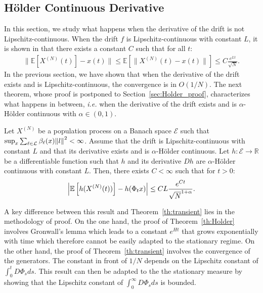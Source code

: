 \documentclass[sigconf]{acmart}
\newcommand\XN{X^{(N)}}
\newcommand\E{\mathcal{E}}
\newcommand\R{\mathbb{R}}
\newcommand\calL{\mathcal{L}}
\newcommand\esp[1]{{\mathchoice{\besp{#1}}{\sesp{#1}}{\sesp{#1}}{\sesp{#1}}}}
\newcommand\besp[1]{\mathbb{E}\left[#1\right]}
\newcommand\sesp[1]{\mathbb{E}[#1]}
\newcommand\norm[1]{{\mathchoice{\bnorm{#1}}{\snorm{#1}}{\snorm{#1}}{\snorm{#1}}}}
\newcommand\bnorm[1]{\left\|#1\right\|}
\newcommand\snorm[1]{\|#1\|}
\newcommand\abs[1]{\left|#1\right|}
\begin{document}
\subsection{Hölder Continuous Derivative}
\label{sec:holder}

In this section, we study what happens when the derivative of the
drift is not Lipschitz-continuous.  When the drift $f$ is
Lipschitz-continuous with constant $L$, it is shown in \cite{kurtz70}
that there exists a constant $C$ such that for all $t$:
\begin{align*}
  \snorm{\sesp{\XN(t)}-x(t)}\le \sesp{\snorm{\XN(t)-x(t)}}\le C
  \frac{e^{Lt}}{\sqrt{N}}. 
\end{align*}
In the previous section, we have shown that when the derivative of the
drift exists and is Lipschitz-continuous, the convergence is in
$O(1/N)$.  The next theorem, whose proof is postponed to
Section~\ref{sec:Holder_proof}, characterizes what happens in between,
\emph{i.e.}  when the derivative of the drift exists and is
$\alpha$-Hölder continuous with $\alpha\in(0,1)$.
\begin{theorem}
  \label{th:Holder}
  Let $\XN$ be a population process on a Banach space $\E$ such that
  $\sup_x\sum_{\ell\in\calL}\beta_\ell(x)\norm{l}^2<\infty$. Assume
  that the drift is Lipschitz-continuous with constant $L$ and that
  its derivative exists and is $\alpha$-Hölder continuous.  Let
  $h:\E\to\R$ be a differentiable function such that $h$ and its
  derivative $Dh$ are $\alpha$-Hölder continuous with constant
  $L$. Then, there exists $C<\infty$ such that for $t>0$:
  \begin{align*}
    \abs{\esp{h(\XN(t))}-h(\Phi_tx)} \le CL\frac{e^{Ct}}{\sqrt{N}^{1+\alpha}}.
  \end{align*}
\end{theorem}

A key difference between this result and Theorem~\ref{th:transient}
lies in the methodology of proof. On the one hand, the proof of
Theorem~\ref{th:Holder} involves Gronwall's lemma which leads to a
constant $e^{Ht}$ that grows exponentially with time which therefore
cannot be easily adapted to the stationary regime. On the other hand,
the proof of Theorem~\ref{th:transient} involves the convergence of
the generators. The constant in front of $1/N$ depends on the
Lipschitz constant of $\int_0^tD\Phi_sds$.  This result can then be
adapted to the the stationary measure by showing that the Lipschitz
constant of $\int_0^\infty D\Phi_sds$ is bounded.
\end{document}
